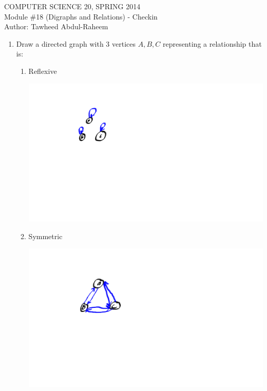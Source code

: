 \documentclass[12pt]{article}
\begin{document}
\textsl{}

\begin{center}
COMPUTER SCIENCE 20, SPRING 2014 \\

Module \#18 (Digraphs and Relations)  - Checkin\\
Author: Tawheed Abdul-Raheem
\end{center}


\begin{enumerate}
\item Draw a directed graph with 3 vertices $A, B, C$ representing a relationship that is:
\begin{enumerate}
\item Reflexive
    \begin{center}
    \includegraphics[scale=0.50]{reflexive.png}
    \end{center}
\item Symmetric
    \begin{center}
    \includegraphics[scale=0.50]{symmetry.png}
    \end{center}

\end{enumerate}
\end{enumerate}
\end{document}

